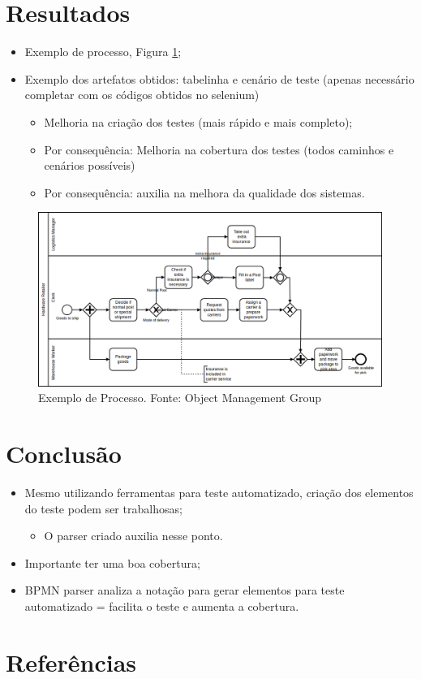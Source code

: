 \documentclass[12pt]{article}
\begin{document}
\section{Resultados}
\begin{itemize}
\item Exemplo de processo, Figura \ref{fig:diagrama_exemplo};
\item Exemplo dos artefatos obtidos: tabelinha e cenário de teste (apenas necessário completar com os códigos obtidos no selenium)
	\begin{itemize}
	\item Melhoria na criação dos testes (mais rápido e mais completo);
	\item Por consequência: Melhoria na cobertura dos testes (todos caminhos e cenários possíveis)
	\item Por consequência: auxilia na melhora da qualidade dos sistemas.
	\end{itemize}
\end{itemize}

\begin{figure}[ht]
\centering
\includegraphics[width=.8\paperwidth]{figuras/diagrama_exemplo.png}
\caption{Exemplo de Processo. Fonte: Object Management Group}
\label{fig:diagrama_exemplo}
\end{figure}

\section{Conclusão}
\begin{itemize}
\item Mesmo utilizando ferramentas para teste automatizado, criação dos elementos do teste podem ser trabalhosas;
\begin{itemize}
\item O parser criado auxilia nesse ponto.
\end{itemize}
\item Importante ter uma boa cobertura;
\item BPMN parser analiza a notação para gerar elementos para teste automatizado = facilita o teste e aumenta a cobertura.
\end{itemize}

\section{Referências}



\end{document}
